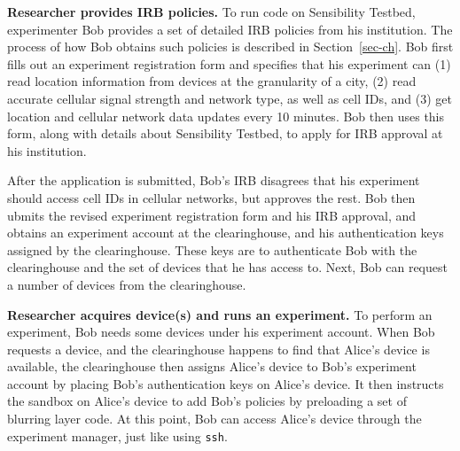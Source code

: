 \textbf{Researcher provides IRB policies.}
To run code on Sensibility Testbed, experimenter Bob provides a
set of detailed IRB policies from his institution. The process of how
Bob obtains such policies is described in Section~\ref{sec-ch}.
Bob first fills out an experiment registration form and specifies that 
his experiment can (1) read location information
from devices at the granularity of a city, (2) read accurate
cellular signal strength and network type, as well as
cell IDs, and (3) get location and
cellular network data updates every 10 minutes. 
Bob then uses this form, along with details about Sensibility Testbed, 
to apply for IRB approval at his institution.

After the application is submitted, Bob's IRB disagrees that his 
experiment should access cell IDs in cellular networks, but approves 
the rest. Bob then ubmits the revised experiment registration form
and his IRB approval, and obtains an experiment account at the
clearinghouse, and his authentication keys assigned by the 
clearinghouse. These keys are to authenticate Bob with the 
clearinghouse and the set of devices that he has access to.
Next, Bob can request a number of devices from the clearinghouse.

\textbf{Researcher acquires device(s) and runs an experiment.}
To perform an experiment, Bob needs some devices under his 
experiment account. 
%
When Bob requests a device, and the clearinghouse
happens to find that Alice's device is available, the clearinghouse then 
assigns Alice's device to Bob's experiment account by placing Bob's
authentication keys on Alice's device. It then instructs 
the sandbox on Alice's device to add Bob's policies by preloading
a set of blurring layer code. At this point, Bob can access Alice's 
device through the experiment manager, just like using \texttt{ssh}.

